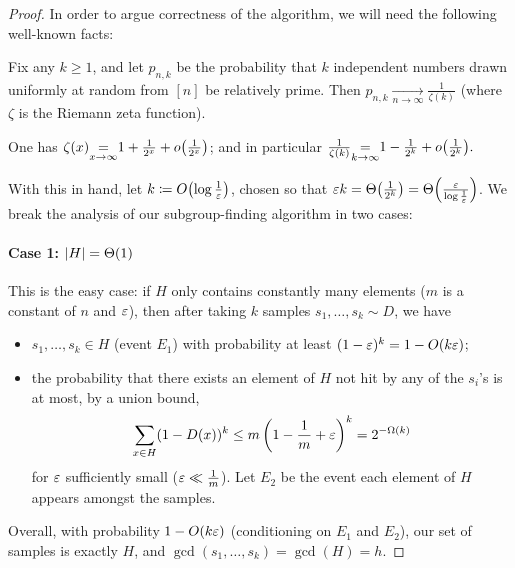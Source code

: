 \begin{proof}
In order to argue correctness of the algorithm, we will need the following well-known facts:

\begin{fact}\label{fact:random:integers:coprime}
Fix any $k\geq 1$, and let $p_{n,k}$ be the probability that $k$ independent numbers drawn uniformly at random from $[n]$ be relatively prime. Then 
$
p_{n,k}\xrightarrow[n\to\infty]{} \frac{1}{\zeta(k)}
$
(where $\zeta$ is the Riemann zeta function).
\end{fact}
\begin{fact} One has
$
\zeta(x) {\displaystyle\operatorname*{=}_{x\to\infty}} 1 + \frac{1}{2^x} + \littleO{\frac{1}{2^x}} 
$;
and in particular
$
\frac{1}{\zeta(k)} {\displaystyle\operatorname*{=}_{k\to\infty}} 1 - \frac{1}{2^k} + \littleO{\frac{1}{2^k}}.
$
\end{fact}

\noindent With this in hand, let $k\eqdef\bigO{\log\frac{1}{\eps}}$,  chosen so that $\eps k = \bigTheta{\frac{1}{2^k}} = \bigTheta{\frac{\eps}{\log\frac{1}{\eps}}}$. We break the analysis of our subgroup-finding algorithm in two cases:
\paragraph*{Case 1: $\abs{H}=\bigTheta{1}$} This is the easy case: if $H$ only contains constantly many elements ($m$ is a constant of $n$ and $\varepsilon$), then after taking $k$ samples $s_1,\dots,s_k\sim D$, we have
\begin{itemize}
  \item $s_1,\dots,s_k\in H$ (event $E_1$) with probability at least $(1-\eps)^k = 1 - \bigO{k\eps}$;  \item the probability that there exists an element of $H$ not hit by any of the $s_i$'s is at most, by a union bound,
    \[
       \sum_{x\in H} (1-\D(x))^k \leq m\left(1-\frac{1}{m}+\eps\right)^k = 2^{-\bigOmega{k}}
    \]
    for $\varepsilon$ sufficiently small ($\varepsilon \ll \frac{1}{m}$). Let $E_2$ be the event each element of $H$ appears amongst the samples.
\end{itemize}
Overall, with probability $1 - \bigO{k\eps}$ (conditioning on $E_1$ and $E_2$), our set of samples is exactly $H$, and $\gcd(s_1,\dots,s_k)=\gcd(H)=h$.

\end{proof}
